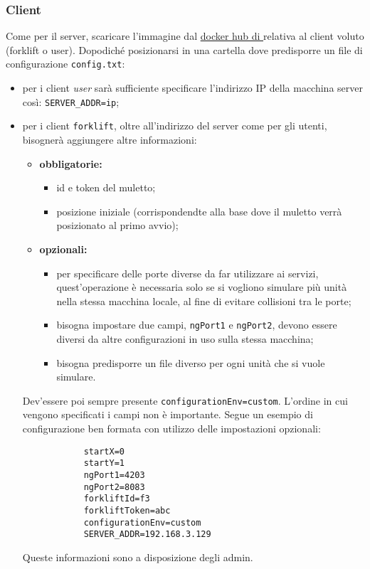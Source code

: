     \subsubsection{Client}
    Come per il server, scaricare l'immagine dal \href{https://hub.docker.com/r/threewaymilkshake}{docker hub di \group{}} relativa al client voluto (forklift o user). Dopodiché posizionarsi in una cartella dove predisporre un file di configurazione \texttt{config.txt}:
    \begin{itemize}
        \item per i client \textit{user} sarà sufficiente specificare l'indirizzo IP della macchina server così: \texttt{SERVER\_ADDR=ip};
        \item per i client \texttt{forklift}, oltre all'indirizzo del server come per gli utenti, bisognerà aggiungere altre informazioni:
        \begin{itemize}
            \item \textbf{obbligatorie: }
            \begin{itemize}
                \item id e token del muletto;
                \item posizione iniziale (corrispondendte alla base dove il muletto verrà posizionato al primo avvio);
            \end{itemize}
            \item \textbf{opzionali: }
            \begin{itemize}
                \item per specificare delle porte diverse da far utilizzare ai servizi, quest'operazione è necessaria solo se si vogliono simulare più unità nella stessa macchina locale, al fine di evitare collisioni tra le porte;
                \item bisogna impostare due campi, \texttt{ngPort1} e \texttt{ngPort2}, devono essere diversi da altre configurazioni in uso sulla stessa macchina;
                \item bisogna predisporre un file diverso per ogni unità che si vuole simulare.
            \end{itemize}
        \end{itemize}
        Dev'essere poi sempre presente \texttt{configurationEnv=custom}. L'ordine in cui vengono specificati i campi non è importante. Segue un esempio di configurazione ben formata con utilizzo delle impostazioni opzionali:
        \begin{verbatim}
            startX=0
            startY=1
            ngPort1=4203
            ngPort2=8083
            forkliftId=f3
            forkliftToken=abc
            configurationEnv=custom
            SERVER_ADDR=192.168.3.129
        \end{verbatim}
        Queste informazioni sono a disposizione degli admin.
    \end{itemize}

